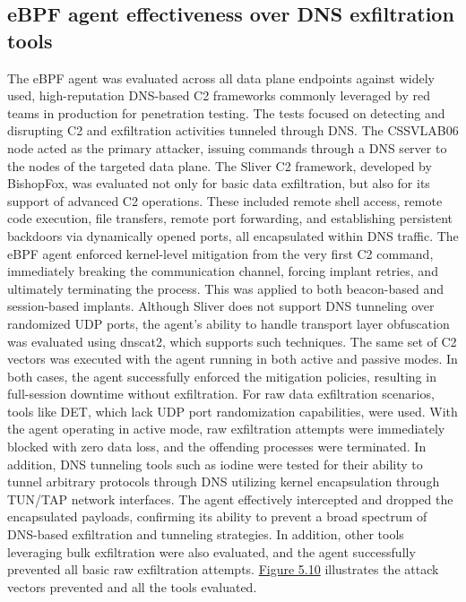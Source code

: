 \documentclass [11pt, proquest] {uwthesis}[2020/02/24]
\begin{document}
\subsection{eBPF agent effectiveness over DNS exfiltration tools}
The eBPF agent was evaluated across all data plane endpoints against widely used, high-reputation DNS-based C2 frameworks commonly leveraged by red teams in production for penetration testing. The tests focused on detecting and disrupting C2 and exfiltration activities tunneled through DNS. The CSSVLAB06 node acted as the primary attacker, issuing commands through a DNS server to the nodes of the targeted data plane.
The Sliver C2 framework, developed by BishopFox, was evaluated not only for basic data exfiltration, but also for its support of advanced C2 operations. These included remote shell access, remote code execution, file transfers, remote port forwarding, and establishing persistent backdoors via dynamically opened ports, all encapsulated within DNS traffic. The eBPF agent enforced kernel-level mitigation from the very first C2 command, immediately breaking the communication channel, forcing implant retries, and ultimately terminating the process. This was applied to both beacon-based and session-based implants.
Although Sliver does not support DNS tunneling over randomized UDP ports, the agent’s ability to handle transport layer obfuscation was evaluated using dnscat2, which supports such techniques. The same set of C2 vectors was executed with the agent running in both active and passive modes. In both cases, the agent successfully enforced the mitigation policies, resulting in full-session downtime without exfiltration.
For raw data exfiltration scenarios, tools like DET, which lack UDP port randomization capabilities, were used. With the agent operating in active mode, raw exfiltration attempts were immediately blocked with zero data loss, and the offending processes were terminated. In addition, DNS tunneling tools such as iodine were tested for their ability to tunnel arbitrary protocols through DNS utilizing kernel encapsulation through TUN/TAP network interfaces. The agent effectively intercepted and dropped the encapsulated payloads, confirming its ability to prevent a broad spectrum of DNS-based exfiltration and tunneling strategies. In addition, other tools leveraging bulk exfiltration were also evaluated, and the agent successfully prevented all basic raw exfiltration attempts.
\hyperref[tab:dns-framework-coverage]{Figure 5.10} illustrates the attack vectors prevented and all the tools evaluated. 
\end{document}
